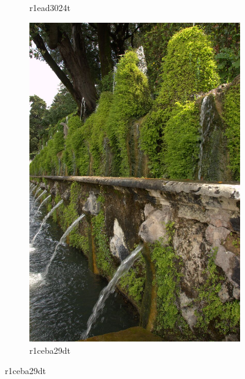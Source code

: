 \documentclass{ipol}
\begin{document}
\begin{figure}[ht]
\begin{subfigure}[c]{.31\linewidth}
    \caption{r1ead3024t}
    \end{subfigure}\hfill%
    \begin{subfigure}[c]{.31\linewidth}\centering
    \includegraphics[height=\linewidth]{images/original/r1ceba29dt.jpeg}
    \caption{r1ceba29dt}
    \end{subfigure}%
    

\end{figure}
\end{document}

